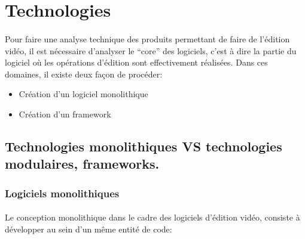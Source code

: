 \newpage

\section{Technologies}

\paragraph{}

Pour faire une analyse technique des produits permettant de faire
de l'édition vidéo, il est nécessaire d'analyser le ``core'' des
logiciels, c'est à dire la partie du logiciel où les opérations
d'édition sont effectivement réalisées. Dans ces domaines, il existe
deux façon de procéder:

\begin{itemize} \setlength{\itemsep}{2mm}

  \item{Création d'un logiciel monolithique}

  \item{Création d'un framework 
   }

\end{itemize}

\subsection {Technologies monolithiques VS
technologies modulaires, frameworks.}


\subsubsection{Logiciels monolithiques }

\paragraph{}

Le conception monolithique  dans le cadre des
logiciels d'édition vidéo, consiste à développer au sein d'un même
entité de code:

